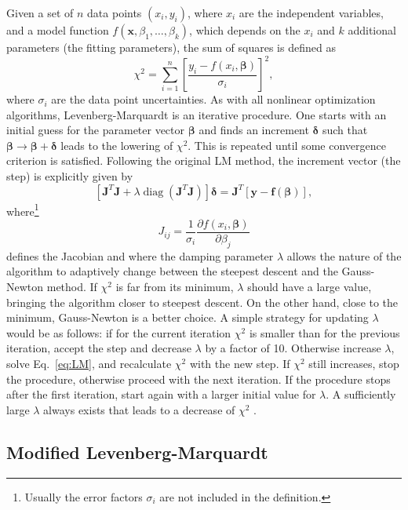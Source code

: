\documentclass{article}
\DeclareMathOperator{\diag}{diag}
\begin{document}
Given a set of $n$ data points $(x_i,y_i)$, where $x_i$ are the independent variables, and a model function $f(\bm x, \beta_1, \ldots, \beta_k)$, which depends on the $x_i$ and $k$ additional parameters (the fitting parameters), the sum of squares is defined as
\begin{equation}
  \label{eq:chi2}
  \chi^2 = \sum_{i=1}^n \left[ \frac{y_i - f(x_i, \bm\beta)}{\sigma_i}
  \right]^2,
\end{equation}
where $\sigma_i$ are the data point uncertainties. As with all nonlinear optimization algorithms, Levenberg-Marquardt is an iterative procedure. One starts with an initial guess for the parameter vector $\bm\beta$ and finds an increment $\bm\delta$ such that $\bm\beta \rightarrow \bm\beta + \bm\delta$ leads to the lowering of $\chi^2$. This is repeated until some convergence criterion is satisfied. Following the original LM method, the increment vector (the step) is explicitly given by
\begin{equation}
  \label{eq:LM}
  \left[\bm J^T \bm J + \lambda\diag \left(\bm J^T \bm J\right)
  \right] \bm\delta = \bm J^T \left[ \bm y - \bm f(\bm \beta) \right],
\end{equation}
where\footnote{Usually the error factors $\sigma_i$ are not included in the
  definition.}
\begin{equation}
  \label{eq:Jacob}
  J_{ij} = \frac{1}{\sigma_i} \frac{\partial f(x_i, \bm \beta)}
  {\partial \beta_j}
\end{equation}
defines the Jacobian and where the damping parameter $\lambda$ allows the nature of the algorithm to adaptively change between the steepest descent and the Gauss-Newton method. If $\chi^2$ is far from its minimum, $\lambda$ should have a large value, bringing the algorithm closer to steepest descent. On the other hand, close to the minimum, Gauss-Newton is a better choice. A simple strategy for updating $\lambda$ would be as follows: if for the current iteration $\chi^2$ is smaller than for the previous iteration, accept the step and decrease $\lambda$ by a factor of 10. Otherwise increase $\lambda$, solve Eq.~\eqref{eq:LM}, and recalculate $\chi^2$ with the new step. If $\chi^2$ still increases, stop the procedure, otherwise proceed with the next iteration. If the procedure stops after the first iteration, start again with a larger initial value for $\lambda$. A sufficiently large $\lambda$ always exists that leads to a decrease of $\chi^2$ \cite{marquardt63}.

\subsection{\label{sec:mod_lm}Modified Levenberg-Marquardt}
\end{document}

